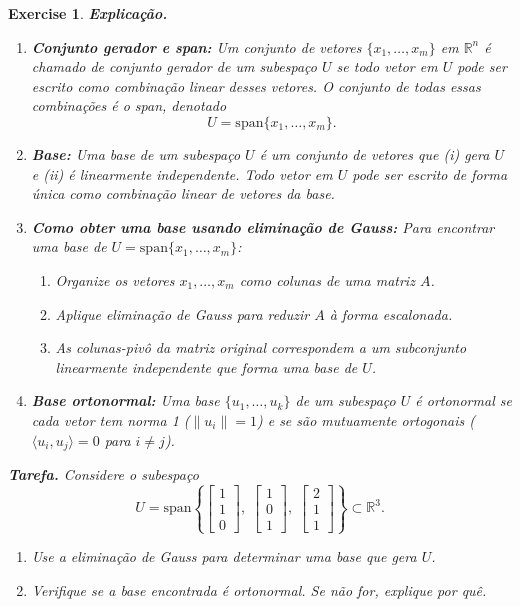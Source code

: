 \documentclass[12pt,a4paper]{article}
\newtheorem{exercise}{Exercise}[section]
\begin{document}
\begin{exercise}
\textbf{Explicação.}

\begin{enumerate}
  \item \textbf{Conjunto gerador e span:}  
  Um conjunto de vetores $\{x_1, \ldots, x_m\}$ em $\mathbb{R}^n$ é chamado de \emph{conjunto gerador} de um subespaço $U$ se todo vetor em $U$ pode ser escrito como combinação linear desses vetores. O conjunto de todas essas combinações é o \emph{span}, denotado
  \[
  U = \mathrm{span}\{x_1, \ldots, x_m\}.
  \]

  \item \textbf{Base:}  
  Uma base de um subespaço $U$ é um conjunto de vetores que (i) gera $U$ e (ii) é linearmente independente. Todo vetor em $U$ pode ser escrito de forma única como combinação linear de vetores da base.

  \item \textbf{Como obter uma base usando eliminação de Gauss:}  
  Para encontrar uma base de $U = \mathrm{span}\{x_1, \ldots, x_m\}$:
  \begin{enumerate}[label=(\roman*)]
    \item Organize os vetores $x_1, \ldots, x_m$ como colunas de uma matriz $A$.  
    \item Aplique eliminação de Gauss para reduzir $A$ à forma escalonada.  
    \item As colunas-pivô da matriz original correspondem a um subconjunto linearmente independente que forma uma base de $U$.  
  \end{enumerate}

  \item \textbf{Base ortonormal:}  
  Uma base $\{u_1, \ldots, u_k\}$ de um subespaço $U$ é \emph{ortonormal} se cada vetor tem norma 1 ($\|u_i\| = 1$) e se são mutuamente ortogonais ($\langle u_i, u_j \rangle = 0$ para $i \neq j$).  
\end{enumerate}

\bigskip

\textbf{Tarefa.}  
Considere o subespaço
\[
U = \mathrm{span}\left\{ 
\begin{bmatrix}1 \\ 1 \\ 0\end{bmatrix}, \;
\begin{bmatrix}1 \\ 0 \\ 1\end{bmatrix}, \;
\begin{bmatrix}2 \\ 1 \\ 1\end{bmatrix}
\right\} \subset \mathbb{R}^3.
\]
\begin{enumerate}[label=(\alph*)]
    \item Use a eliminação de Gauss para determinar uma base que gera $U$.  
    \item Verifique se a base encontrada é ortonormal. Se não for, explique por quê.  
\end{enumerate}
\end{exercise}
\end{document}
